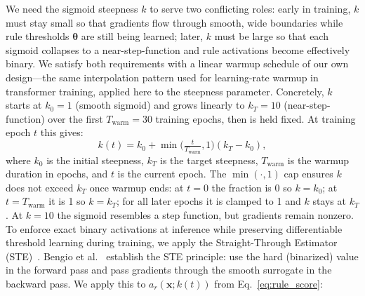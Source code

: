 \documentclass[conference]{IEEEtran}
\begin{document}
We need the sigmoid steepness $k$ to serve two conflicting roles: early in
training, $k$ must stay small so that gradients flow through smooth,
wide boundaries while rule thresholds $\boldsymbol{\theta}$ are still being
learned; later, $k$ must be large so that each sigmoid collapses to a
near-step-function and rule activations become effectively binary.
We satisfy both requirements with a linear warmup schedule of our own
design---the same interpolation pattern used for learning-rate warmup in
transformer training, applied here to the steepness parameter.
Concretely, $k$ starts at $k_0{=}1$ (smooth sigmoid) and grows linearly
to $k_T{=}10$ (near-step-function) over the first
$T_{\mathrm{warm}}{=}30$ training epochs, then is held fixed.
At training epoch $t$ this gives:
\begin{equation}
  k(t) = k_0 + \min\!\bigl(\tfrac{t}{T_{\mathrm{warm}}},1\bigr)(k_T{-}k_0),
  \label{eq:anneal}
\end{equation}
where $k_0$ is the initial steepness, $k_T$ is the target steepness,
$T_{\mathrm{warm}}$ is the warmup duration in epochs, and $t$ is the
current epoch. The $\min(\cdot,1)$ cap ensures $k$ does not exceed
$k_T$ once warmup ends: at $t{=}0$ the fraction is 0 so $k{=}k_0$;
at $t{=}T_{\mathrm{warm}}$ it is 1 so $k{=}k_T$; for all later epochs
it is clamped to 1 and $k$ stays at $k_T$.
At $k{=}10$ the sigmoid resembles a step function, but gradients remain
nonzero. To enforce exact binary activations at inference while preserving
differentiable threshold learning during training, we apply the
Straight-Through Estimator (STE)~\cite{bengio2013ste,liu2023reinmax}.
Bengio et al.~\cite{bengio2013ste} establish the STE principle: use the
hard (binarized) value in the forward pass and pass gradients through the
smooth surrogate in the backward pass. We apply this to
$a_r(\mathbf{x};k(t))$ from Eq.~\ref{eq:rule_score}:
\end{document}
